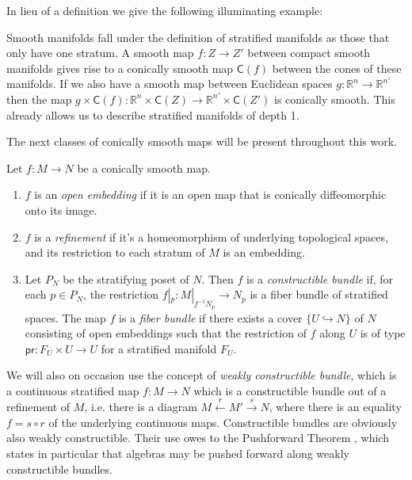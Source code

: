 \documentclass[../text]{subfiles}
\begin{document}
In lieu of a definition we give the following illuminating example:
%
\begin{example}
    Smooth manifolds fall under the definition of stratified manifolds as those that only have one stratum. A smooth map $f: Z \xrightarrow{} Z'$ between compact smooth manifolds gives rise to a conically smooth map $\mathsf{C}(f)$ between the cones of these manifolds. If we also have a smooth map between Euclidean spaces $g: \mathbb{R}^{n} \xrightarrow{} \mathbb{R}^{n'}$ then the map $g \times \mathsf{C}(f): \mathbb{R}^{n} \times \mathsf{C} (Z) \xrightarrow{} \mathbb{R}^{n'} \times \mathsf{C} (Z')$ is conically smooth. This already allows us to describe stratified manifolds of depth 1.
\end{example}

The next classes of conically smooth maps will be present throughout this work.

\begin{definition}
    Let $f: M \rightarrow N$ be a conically smooth map.
    \begin{enumerate}
        \item $f$ is an \emph{open embedding} if it is an open map that is conically diffeomorphic onto its image.
        \item $f$ is a \emph{refinement} if it's a homeomorphism of underlying topological spaces, and its restriction to each stratum of $M$ is an embedding.
        \item Let $P_N$ be the stratifying poset of $N$. Then $f$ is a \emph{constructible bundle} if, for each $p \in P_N$, the restriction $f|_p: M|_{f^{-1} N_p} \rightarrow N_p$ is a fiber bundle of stratified spaces. The map $f$ is a \emph{fiber bundle} if there exists a cover $\{U\hookrightarrow N\}$ of $N$ consisting of open embeddings such that the restriction of $f$ along $U$ is of type $\mathsf{pr}\colon F_U\times U\to U$ for a stratified manifold $F_U$.
    \end{enumerate}
\end{definition}

\begin{remark}
    We will also on occasion use the concept of \emph{weakly constructible bundle}, which is a continuous stratified map $f: M \rightarrow N$ which is a constructible bundle out of a refinement of $M$, i.e. there is a diagram $M \xleftarrow{r} M' \xrightarrow{s} N$, where there is an equality $f = s \circ r$ of the underlying continuous maps. Constructible bundles are obviously also weakly constructible. Their use owes to the Pushforward Theorem \cite[Theorem 2.25]{aft_fhstrat}, which states in particular that algebras may be pushed forward along weakly constructible bundles. 
\end{remark}
\end{document}

